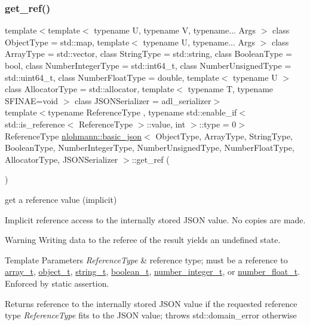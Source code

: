 \subsubsection{\texorpdfstring{get\_ref()}{get\_ref()}\hspace{0.1cm}{\footnotesize\ttfamily [1/2]}}
{\footnotesize\ttfamily template$<$template$<$ typename U, typename V, typename... Args $>$ class Object\+Type = std\+::map, template$<$ typename U, typename... Args $>$ class Array\+Type = std\+::vector, class String\+Type  = std\+::string, class Boolean\+Type  = bool, class Number\+Integer\+Type  = std\+::int64\+\_\+t, class Number\+Unsigned\+Type  = std\+::uint64\+\_\+t, class Number\+Float\+Type  = double, template$<$ typename U $>$ class Allocator\+Type = std\+::allocator, template$<$ typename T, typename S\+F\+I\+N\+A\+E=void $>$ class J\+S\+O\+N\+Serializer = adl\+\_\+serializer$>$ \\
template$<$typename Reference\+Type , typename std\+::enable\+\_\+if$<$ std\+::is\+\_\+reference$<$ Reference\+Type $>$\+::value, int $>$\+::type  = 0$>$ \\
Reference\+Type \mbox{\hyperlink{classnlohmann_1_1basic__json}{nlohmann\+::basic\+\_\+json}}$<$ Object\+Type, Array\+Type, String\+Type, Boolean\+Type, Number\+Integer\+Type, Number\+Unsigned\+Type, Number\+Float\+Type, Allocator\+Type, J\+S\+O\+N\+Serializer $>$\+::get\+\_\+ref (\begin{DoxyParamCaption}{ }\end{DoxyParamCaption})\hspace{0.3cm}{\ttfamily [inline]}}



get a reference value (implicit) 

Implicit reference access to the internally stored J\+S\+ON value. No copies are made.

\begin{DoxyWarning}{Warning}
Writing data to the referee of the result yields an undefined state.
\end{DoxyWarning}

\begin{DoxyTemplParams}{Template Parameters}
{\em Reference\+Type} & reference type; must be a reference to \mbox{\hyperlink{classnlohmann_1_1basic__json_ae095578e03df97c5b3991787f1056374}{array\+\_\+t}}, \mbox{\hyperlink{classnlohmann_1_1basic__json_aa1eb13d5aa86f80cbee6c58e90fbaf49}{object\+\_\+t}}, \mbox{\hyperlink{classnlohmann_1_1basic__json_a61f8566a1a85a424c7266fb531dca005}{string\+\_\+t}}, \mbox{\hyperlink{classnlohmann_1_1basic__json_a4c919102a9b4fe0d588af64801436082}{boolean\+\_\+t}}, \mbox{\hyperlink{classnlohmann_1_1basic__json_a98e611d67b7bd75307de99c9358ab2dc}{number\+\_\+integer\+\_\+t}}, or \mbox{\hyperlink{classnlohmann_1_1basic__json_a88d6103cb3620410b35200ee8e313d97}{number\+\_\+float\+\_\+t}}. Enforced by static assertion.\\
\hline
\end{DoxyTemplParams}
\begin{DoxyReturn}{Returns}
reference to the internally stored J\+S\+ON value if the requested reference type {\itshape Reference\+Type} fits to the J\+S\+ON value; throws std\+::domain\+\_\+error otherwise
\end{DoxyReturn}

